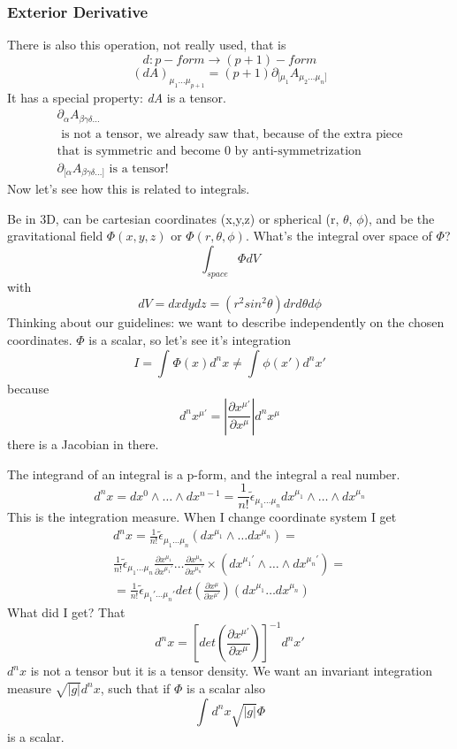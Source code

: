 \subsubsection{Exterior Derivative}
There is also this operation, not really used, that is
\[
d : p-form \to \left( p+1 \right)-form
\]
\[
	\left( dA \right)_{\mu _{1}\ldots \mu _{p+1} } = \left( p+1 \right) \partial_{[\mu _{1}}A_{\mu _{2}\ldots \mu _{n}]}
\]
It has a special property: \emph{dA} is a tensor.
\begin{gather}
\partial_{\alpha }A_{\beta  \gamma  \delta \ldots }\\
\text{ is not a tensor, we already saw that, because of the extra piece}\\
\text{that is symmetric and become 0 by anti-symmetrization }\\
\partial_{[\alpha }A_{\beta  \gamma  \delta  \ldots ]} \text{ is a tensor! }
\end{gather}
Now let's see how this is related to integrals.\par
Be in 3D, can be cartesian coordinates (x,y,z) or spherical (r, $\theta $, $\phi $), and be the gravitational field $\Phi\left( x,y,z \right)$ or $\Phi \left( r,\theta ,\phi  \right)$. What's the integral over space of $\Phi $?
\[
\int_{space}^{}{\Phi dV}
\]
with 
\[
dV = dxdydz = \left( r^{2}sin^{2}\theta  \right)drd\theta d\phi 
\]
Thinking about our guidelines: we want to describe independently on the chosen coordinates. $\Phi $ is a scalar, so let's see it's integration
\[
I = \int_{}^{}{\Phi \left( x \right) d^{n}x} \neq \int_{}^{}{\phi \left( x' \right)d^{n}x'}
\]
because
\[
d^{n}x^{\mu '} = \left| \frac{\partial x^{\mu '}}{\partial x^{\mu }}\right| d^{n}x^{\mu }
\]
there is a Jacobian in there.\par
The integrand of an integral is a p-form, and the integral a real number.
\[
d^{n}x = dx^{0}\wedge \ldots  \wedge dx^{n-1} = \frac{1}{n!} \tilde{\epsilon }_{\mu_{1}\ldots \mu _{n}}dx^{\mu _{1}} \wedge \ldots \wedge dx^{\mu _{n}}
\]
This is the integration measure. When I change coordinate system I get
\begin{gather}
d^{n}x = \frac{1}{n!} \tilde{\epsilon}_{\mu_{1}\ldots \mu _{n}} \left( dx^{\mu _{1}} \wedge \ldots dx^{\mu _{n}} \right) =\\
\frac{1}{n!}\tilde{\epsilon }_{\mu _{1}\ldots \mu _{n}} \frac{\partial x^{\mu _{1}}}{\partial x^{\mu _{1}'}} \ldots \frac{\partial x^{\mu _{n}}}{\partial x^{\mu _{n}'}} \times \left( dx^{\mu _{1}'} \wedge \ldots \wedge dx^{\mu _{n}'} \right) = \\
= \frac{1}{n!} \tilde{\epsilon }_{\mu _{1}' \ldots \mu_{n}'} det\left( \frac{\partial x^{\mu }}{\partial x^{\mu '}}  \right)\left( dx^{\mu_{1}}\ldots dx^{\mu _{n}} \right)
\end{gather}
What did I get? That 
\[
	d^{n}x = \left[ det\left( \frac{\partial x^{\mu' }}{\partial x^{\mu }}  \right)\right]^{-1} d^{n}x'
\]
$d^{n}x$ is not a tensor but it is a tensor density.
We want an invariant integration measure $\sqrt{|g|}d^{n}x$, such that if $\Phi $ is a scalar also
\[
	\int_{}^{}{d^{n}x \sqrt{|g|}\Phi }
\]
is a scalar.\par

